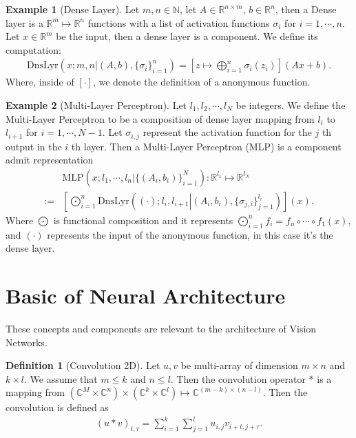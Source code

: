 \documentclass[]{article}
\theoremstyle{definition}
\newtheorem{definition}{Definition}
\newtheorem{example}{Example}[subsection]
\numberwithin{equation}{subsection}
\begin{document}
    \begin{example}[Dense Layer]
        Let $m, n \in \mathbb N$, let $A \in \mathbb R^{n\times m}$, $b \in \mathbb R^n$, then a Dense layer is a $\mathbb R^m \mapsto \mathbb R^n$ functions with a list of activation functions $\sigma_i$ for $i = 1, \cdots, n$. 
        Let $x \in \mathbb R^m$ be the input, then a dense layer is a component. We define its computation: 
        $$
        \begin{aligned}
            \text{DnsLyr}(x ; m, n | (A, b), \{\sigma_i\}_{i=1}^n) = 
            \left[
                z \mapsto \bigoplus_{i = 1}^n\sigma_i(z_i)
            \right]
            \left(
                Ax + b
            \right). 
        \end{aligned}
        $$
        Where, inside of $[\cdot]$, we denote the definition of a anonymous function. 
    \end{example}
    
    \begin{example}[Multi-Layer Perceptron]
        Let $l_1, l_2, \cdots, l_N$ be integers. 
        We define the Multi-Layer Perceptron to be a composition of dense layer mapping from $l_{i}$ to $l_{i + 1}$ for $i = 1, \cdots, N - 1$. 
        Let $\sigma_{i, j}$ represent the activation function for the $j$ th output in the $i$ th layer. 
        Then a Multi-Layer Perceptron (MLP) is a component admit representation
        $$
        \begin{aligned}
            & \text{MLP}\left(x ; l_1, \cdots, l_n | \{(A_i, b_i)\}_{i=1}^N\right): \mathbb R^{l_1} \mapsto \mathbb R^{l_N}
            \\
            :=&
            \left[
            \bigodot_{i = 1}^n \text{DnsLyr}
            \left(
                (\cdot) ; l_i, l_{i + 1} \left| (A_i, b_i), \{\sigma_{j, i}\}_{j=1}^{l_i} \right.
            \right)
            \right](x). 
        \end{aligned}
        $$
        Where $\bigodot$ is functional composition and it represents $\bigodot_{i=1}^n f_i = f_n\circ\cdots\circ f_1(x)$, and $(\cdot)$ represents the input of the anonymous function, in this case it's the dense layer. 
    \end{example}

\section{Basic of Neural Architecture}
    These concepts and components are relevant to the architecture of Vision Networks. 
    \begin{definition}[Convolution 2D]
        Let $u, v$ be multi-array of dimension $m \times n$ and $k \times l$. 
        We assume that $m \le  k$ and $n \le l$.
        Then the convolution operator $*$ is a mapping from $(\mathbb C^M \times \mathbb C^n)\times (\mathbb C^k \times \mathbb C^l) \mapsto \mathbb C^{(m - k)\times (n - l)}$. 
        Then the convolution is defined as 
        $$
        \begin{aligned}
            (u* v)_{t, \tau} = 
            \sum_{i = 1}^{k}\sum_{j = 1}^{l}u_{i, j}v_{i + t, j + \tau}. 
        \end{aligned}
        $$
    \end{definition}
\end{document}
